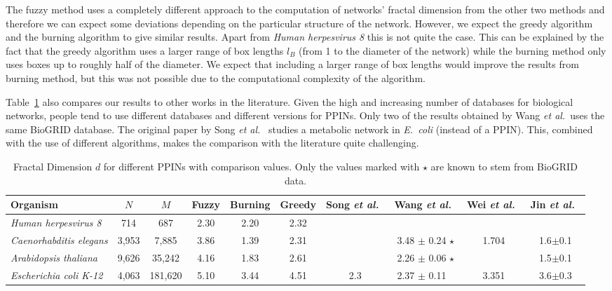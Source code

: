 \documentclass[9pt,onecolumn,twoside]{pnas-new}
\begin{document}
The fuzzy method uses a completely different approach to the computation of networks' fractal dimension from the other two methods and therefore we can expect some deviations depending on the particular structure of the network. However, we expect the greedy algorithm and the burning algorithm to give similar results. Apart from \emph{Human herpesvirus 8} this is not quite the case. This can be explained by the fact that the greedy algorithm uses a larger range of box lengths $l_B$ (from 1 to the diameter of the network) while the burning method only uses boxes up to roughly half of the diameter. We expect that including a larger range of box lengths would improve the results from burning method, but this was not possible due to the computational complexity of the algorithm.

Table~\ref{tab:results} also compares our results to other works in the literature. Given the high and increasing number of databases for biological networks, people tend to use different databases and different versions for PPINs. Only two of the results obtained by Wang \emph{et al.}\ uses the same BioGRID database. The original paper by Song \emph{et al.}\ \cite{song2007} studies a metabolic network in \emph{E.\ coli} (instead of a PPIN). This, combined with the use of different algorithms, makes the comparison with the literature quite challenging. 

\begin{table}
\centering
\caption{\textmd{Fractal Dimension $d$ for different PPINs with comparison values. Only the values marked with $\star$ are known to stem from BioGRID data.}} \label{tab:results} 
\begin{tabular}{l | c c | c c c | c c c c}
\hline
Organism & $N$ & $M$ & Fuzzy & Burning & Greedy & Song \emph{et al.}\ \cite{song2004} & Wang \emph{et al.}\ \cite{anh2011} & Wei \emph{et al.}\ \cite{wei2013} & Jin \emph{et al.}\ \cite{jin2013}\\
\hline
\emph{Human herpesvirus 8}      & 714   & 687       & 2.30 & 2.20 & 2.32 &  &  &  &\\
\emph{Caenorhabditis elegans}   & 3,953  & 7,885      & 3.86 & 1.39 & 2.31 & & 3.48 $\pm$ 0.24 $\star$  &  1.704 & 1.6$\pm$0.1\\
\emph{Arabidopsis thaliana}     & 9,626  & 35,242    & 4.16 & 1.83 & 2.61 & & 2.26 $\pm$ 0.06 $\star$  &  &1.5$\pm$0.1\\
\emph{Escherichia coli K-12}    & 4,063  & 181,620   & 5.10 & 3.44 & 4.51 & 2.3 & 2.37 $\pm$ 0.11 \,\,\,  &  3.351 & 3.6$\pm$0.3\\
\hline
\end{tabular}
\end{table}
\end{document}
